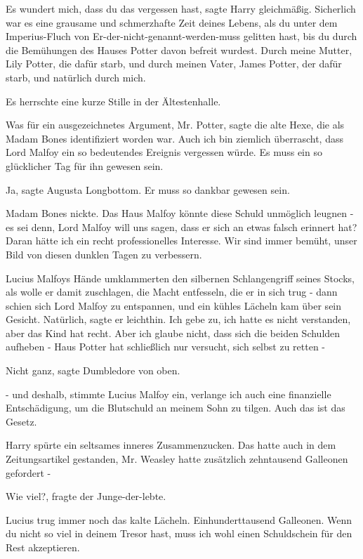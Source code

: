 \glqq{}Es wundert mich, dass du das vergessen hast\grqq{}, sagte Harry
gleichmäßig. \glqq{}Sicherlich war es eine grausame und schmerzhafte Zeit deines
Lebens, als du unter dem Imperius-Fluch von Er-der-nicht-genannt-werden-muss
gelitten hast, bis du durch die Bemühungen des Hauses Potter davon befreit
wurdest. Durch meine Mutter, Lily Potter, die dafür starb, und durch meinen
Vater, James Potter, der dafür starb, und natürlich durch mich.\grqq{}

Es herrschte eine kurze Stille in der Ältestenhalle.

\glqq{}Was für ein ausgezeichnetes Argument, Mr. Potter\grqq{}, sagte die alte
Hexe, die als Madam Bones identifiziert worden war. \glqq{}Auch ich bin ziemlich
überrascht, dass Lord Malfoy ein so bedeutendes Ereignis vergessen würde. Es
muss ein so glücklicher Tag für ihn gewesen sein.\grqq{}

\glqq{}Ja\grqq{}, sagte Augusta Longbottom. \glqq{}Er muss so dankbar gewesen
sein.\grqq{}

Madam Bones nickte. \glqq{}Das Haus Malfoy könnte diese Schuld unmöglich leugnen
- es sei denn, Lord Malfoy will uns sagen, dass er sich an etwas falsch erinnert
hat? Daran hätte ich ein recht professionelles Interesse. Wir sind immer bemüht,
unser Bild von diesen dunklen Tagen zu verbessern.\grqq{}

Lucius Malfoys Hände umklammerten den silbernen Schlangengriff seines Stocks,
als wolle er damit zuschlagen, die Macht entfesseln, die er in sich trug - dann
schien sich Lord Malfoy zu entspannen, und ein kühles Lächeln kam über sein
Gesicht. \glqq{}Natürlich\grqq{}, sagte er leichthin. \glqq{}Ich gebe zu, ich
hatte es nicht verstanden, aber das Kind hat recht. Aber ich glaube nicht, dass
sich die beiden Schulden aufheben - Haus Potter hat schließlich nur versucht,
sich selbst zu retten -\grqq{}

\glqq{}Nicht ganz\grqq{}, sagte Dumbledore von oben.

\glqq{}- und deshalb\grqq{}, stimmte Lucius Malfoy ein, \glqq{}verlange ich auch
eine finanzielle Entschädigung, um die Blutschuld an meinem Sohn zu tilgen. Auch
das ist das Gesetz.\grqq{}

Harry spürte ein seltsames inneres Zusammenzucken. Das hatte auch in dem
Zeitungsartikel gestanden, Mr. Weasley hatte zusätzlich zehntausend Galleonen
gefordert -

\glqq{}Wie viel?\grqq{}, fragte der Junge-der-lebte.

Lucius trug immer noch das kalte Lächeln. \glqq{}Einhunderttausend Galleonen.
Wenn du nicht so viel in deinem Tresor hast, muss ich wohl einen Schuldschein
für den Rest akzeptieren.\grqq{}

